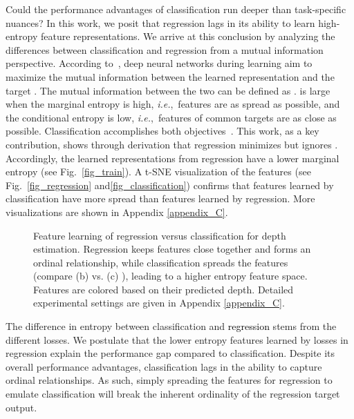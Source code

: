\documentclass{article} \usepackage{iclr2023_conference,times}
\makeatletter
\newcommand*{\ie}{i.e.\@\xspace}
\def\ie{\mbox{\textit{i.e.}, }}
\def\shihao{\textcolor{black}}
\makeatother
\begin{document}
Could the performance advantages of classification 
run deeper than task-specific nuances? In this work, we posit that regression lags in its ability to learn high-entropy feature representations. We arrive at this conclusion by analyzing the differences between classification and regression from a mutual information perspective.   
According to~\citet{shwartz2017opening}, deep neural networks during learning aim to maximize the mutual information between the learned representation  and the target . The mutual information between the two can be defined as  . 
 is large when the marginal entropy  is high, \ie features  are as spread as possible, and the conditional entropy  is low, \ie features of common targets are as close as possible. 
Classification accomplishes both objectives~\citep{boudiaf2020unifying}.  This work, as a key contribution, shows through derivation that regression minimizes  but ignores .  Accordingly, the learned representations  from regression have a 
lower marginal entropy (see Fig.~\ref{fig_train}).  A t-SNE visualization of the features (see Fig.~\ref{fig_regression} and\ref{fig_classification}) confirms that features learned by classification have more spread than features learned by regression. More visualizations are shown in Appendix \ref{appendix_C}.

\begin{figure}[!t]
\centering

\caption{Feature learning of regression versus classification for depth estimation.
Regression keeps features close together and forms an ordinal relationship, while classification spreads the features (compare (b) vs. (c) ), leading to a higher entropy feature space. Features are colored based on their predicted depth. Detailed experimental settings are given in Appendix \ref{appendix_C}.
}
\label{fig_motivation1}
\end{figure}

The difference in entropy between classification and \shihao{regression} stems from the different losses. We postulate that the lower entropy features learned by  losses in regression explain the performance gap compared to classification.  Despite its overall performance advantages, classification lags in the ability to capture ordinal relationships.  As such, simply spreading the features for regression to emulate classification will break the inherent ordinality of the regression target output.  
\end{document}
